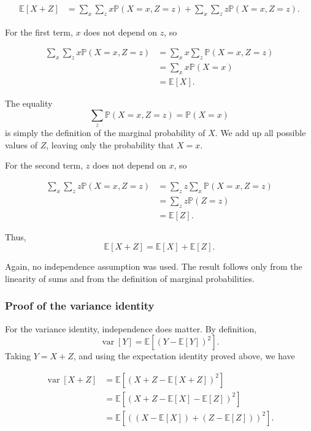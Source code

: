 \documentclass{article}
\begin{document}
\begin{tcolorbox}[breakable,colback=gray!5,colframe=gray!60,title=Solution]
\begin{align*}
  \mathbb{E}[X+Z]
  &=
  \sum_x \sum_z x\mathbb{P}(X=x,Z=z)
  +
  \sum_x \sum_z z\mathbb{P}(X=x,Z=z).
\end{align*}

For the first term, \(x\) does not depend on \(z\), so

\begin{align*}
  \sum_x \sum_z x\mathbb{P}(X=x,Z=z)
  &=
  \sum_x x \sum_z \mathbb{P}(X=x,Z=z) \\
  &=
  \sum_x x \mathbb{P}(X=x) \\
  &=
  \mathbb{E}[X].
\end{align*}

The equality
\[
  \sum_z \mathbb{P}(X=x,Z=z) = \mathbb{P}(X=x)
\]
is simply the definition of the marginal probability of \(X\). We add up all possible
values of \(Z\), leaving only the probability that \(X=x\).

For the second term, \(z\) does not depend on \(x\), so

\begin{align*}
  \sum_x \sum_z z\mathbb{P}(X=x,Z=z)
  &=
  \sum_z z \sum_x \mathbb{P}(X=x,Z=z) \\
  &=
  \sum_z z \mathbb{P}(Z=z) \\
  &=
  \mathbb{E}[Z].
\end{align*}

Thus,
\[
  \mathbb{E}[X+Z]
  =
  \mathbb{E}[X]+\mathbb{E}[Z].
\]

Again, no independence assumption was used. The result follows only from the linearity
of sums and from the definition of marginal probabilities.

\subsubsection*{Proof of the variance identity}

For the variance identity, independence does matter. By definition,
\[
  \operatorname{var}[Y] = \mathbb{E}\left[(Y-\mathbb{E}[Y])^2\right].
\]
Taking \(Y=X+Z\), and using the expectation identity proved above, we have

\begin{align*}
  \operatorname{var}[X+Z]
  &=
  \mathbb{E}\left[\left(X+Z-\mathbb{E}[X+Z]\right)^2\right] \\
  &=
  \mathbb{E}\left[\left(X+Z-\mathbb{E}[X]-\mathbb{E}[Z]\right)^2\right] \\
  &=
  \mathbb{E}\left[\left((X-\mathbb{E}[X])+(Z-\mathbb{E}[Z])\right)^2\right].
\end{align*}


\end{tcolorbox}
\end{document}
